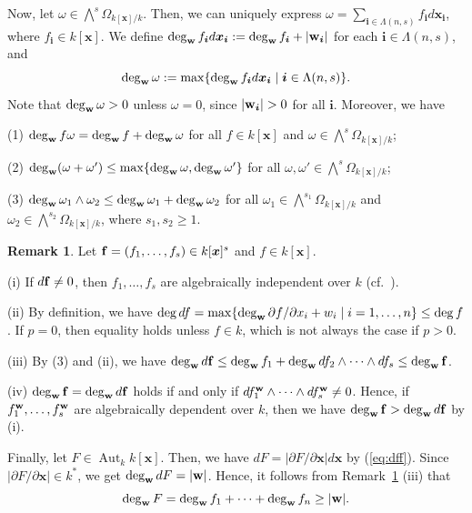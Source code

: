 \documentclass{amsart}
\theoremstyle{plain}
\theoremstyle{definition}
\newtheorem{rem}[thm]{Remark}
\newcommand{\Aut }{\mathop{\mathrm{Aut}}\nolimits}
\newcommand{\nd}{\noindent}
\newcommand{\x}{{\boldsymbol x}}
\newcommand{\w}{{\bf w}}
\newcommand{\bi}{{\boldsymbol i}}
\newcommand{\ff}{{\bf f}}
\newcommand{\kx}{k[\x]}
\newcommand{\degww  }{\mathop{\rm deg}_{\w }\nolimits}
\begin{document}
Now, 
let $\omega \in \bigwedge ^s\Omega _{\kx /k}$. 
Then, 
we can uniquely express 
$\omega 
=\sum _{\bi \in \Lambda (n,s)}f_{\bi }d\x _{\bi }$, 
where $f_{\bi }\in \kx $. 
We define 
$\degww  f_{\bi }d\x _{\bi }:=\degww  f_{\bi }+|\w _{\bi }|$ 
for each $\bi \in \Lambda (n,s)$, 
and 
\begin{equation}\label{eq:deg omega}
\degww  \omega :=\max \{ \degww  f_{\bi }d\x _{\bi }
\mid \bi \in \Lambda (n,s)\} . 
\end{equation}
Note that $\degww  \omega >0$ 
unless $\omega =0$, 
since $|\w _{\bi }|>0$ for all $\bi $. 
Moreover, we have 


\nd 
(1) $\degww f\omega =\degww f+\degww \omega $ 
for all $f\in \kx $ 
and $\omega \in \bigwedge ^s\Omega _{\kx /k}$; 


\nd 
(2) $\degww  (\omega +\omega ')\le \max \{ 
\degww  \omega ,\degww  \omega '\} $ 
for all 
$\omega ,\omega '\in \bigwedge ^s\Omega _{\kx /k}$; 

\nd 
(3) 
$\degww  \omega _1\wedge \omega _2
\le \degww  \omega _1+\degww  \omega _2$ 
for all $\omega _1\in \bigwedge ^{s_1}\Omega _{\kx /k}$ and 
$\omega _2\in \bigwedge ^{s_2}\Omega _{\kx /k}$, 
where $s_1,s_2\ge 1$. 




\begin{rem}\label{rem:independence}\rm 
Let $\ff =(f_1,\ldots ,f_s)\in \kx ^s$ and $f\in \kx $. 

\nd (i) 
If $d\ff \ne 0$, then 
$f_1,\ldots ,f_s$ are 
algebraically independent over $k$ 
(cf.\ \cite[\S 26]{Matsumura}). 




\nd (ii) 
By definition, we have 
$\deg df=\max \{ \degww \partial f/\partial x_i+w_i
\mid i=1,\ldots ,n\} \le \deg f$. 
If $p=0$, 
then equality holds unless $f\in k$, 
which is not 
always the case if $p>0$. 



\nd (iii) 
By (3) and (ii), 
we have 
$\degww d\ff \le 
\degww f_1+\degww df_2\wedge \cdots \wedge df_s\le 
\degww \ff $. 




\nd (iv) $\degww \ff = \degww d\ff $ holds if and only if 
$df_1^{\w }\wedge \cdots \wedge df_s^{\w }\ne 0$. 
Hence, 
if $f_1^{\w },\ldots ,f_s^{\w }$ are algebraically dependent over $k$, 
then we have $\degww \ff >\degww d\ff $ by (i). 
\end{rem}

Finally, let $F\in \Aut _k\kx $. 
Then, 
we have $dF =|\partial F/\partial \x |d\x $ by (\ref{eq:dff}). 
Since $|\partial F/\partial \x |\in k^*$, 
we get $\degww  dF=|\w |$. 
Hence, 
it follows from Remark~\ref{rem:independence} (iii) that 
\begin{equation}\label{eq:deg F}
\degww  F=\degww f_1+\cdots +\degww f_n\ge |\w |. 
\end{equation}
\end{document}
